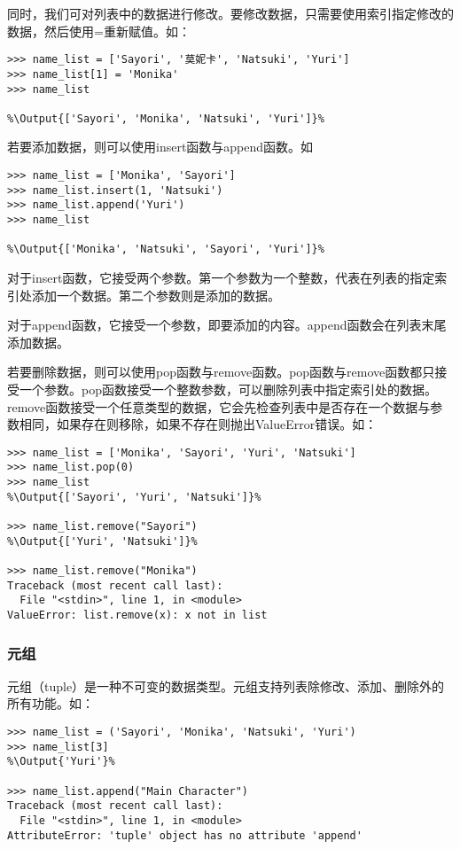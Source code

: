 同时，我们可对列表中的数据进行修改。要修改数据，只需要使用索引指定修改的数据，然后使用=重新赋值。如：
\begin{lstlisting}
>>> name_list = ['Sayori', '莫妮卡', 'Natsuki', 'Yuri']
>>> name_list[1] = 'Monika'
>>> name_list

%\Output{['Sayori', 'Monika', 'Natsuki', 'Yuri']}%
\end{lstlisting}

若要添加数据，则可以使用insert函数与append函数。如
\begin{lstlisting}
>>> name_list = ['Monika', 'Sayori']
>>> name_list.insert(1, 'Natsuki')
>>> name_list.append('Yuri')
>>> name_list

%\Output{['Monika', 'Natsuki', 'Sayori', 'Yuri']}%
\end{lstlisting}

对于insert函数，它接受两个参数。第一个参数为一个整数，代表在列表的指定索引处添加一个数据。第二个参数则是添加的数据。

对于append函数，它接受一个参数，即要添加的内容。append函数会在列表末尾添加数据。

若要删除数据，则可以使用pop函数与remove函数。pop函数与remove函数都只接受一个参数。pop函数接受一个整数参数，可以删除列表中指定索引处的数据。remove函数接受一个任意类型的数据，它会先检查列表中是否存在一个数据与参数相同，如果存在则移除，如果不存在则抛出ValueError错误。如：
\begin{lstlisting}
>>> name_list = ['Monika', 'Sayori', 'Yuri', 'Natsuki']
>>> name_list.pop(0)
>>> name_list
%\Output{['Sayori', 'Yuri', 'Natsuki']}%

>>> name_list.remove("Sayori")
%\Output{['Yuri', 'Natsuki']}%

>>> name_list.remove("Monika")
Traceback (most recent call last):
  File "<stdin>", line 1, in <module>
ValueError: list.remove(x): x not in list
\end{lstlisting}

\subsubsection{元组}
元组（tuple）是一种不可变的数据类型。元组支持列表除修改、添加、删除外的所有功能。如：
\begin{lstlisting}
>>> name_list = ('Sayori', 'Monika', 'Natsuki', 'Yuri')
>>> name_list[3]
%\Output{'Yuri'}%

>>> name_list.append("Main Character")
Traceback (most recent call last):
  File "<stdin>", line 1, in <module>
AttributeError: 'tuple' object has no attribute 'append'
\end{lstlisting}

